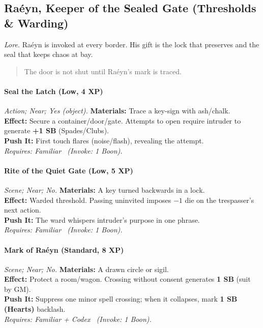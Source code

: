 \subsection{Raéyn, Keeper of the Sealed Gate (Thresholds \& Warding)}
\textit{Lore.} Raéyn is invoked at every border. His gift is the lock that preserves and the seal that keeps chaos at bay.

\begin{quote}
The door is not shut until Raéyn’s mark is traced.
\end{quote}

\paragraph{Seal the Latch (Low, 4 XP)} \emph{Action; Near; Yes (object).}
\textbf{Materials:} Trace a key-sign with ash/chalk.\\
\textbf{Effect:} Secure a container/door/gate. Attempts to open require intruder to generate \textbf{+1 SB} (Spades/Clubs).\\
\textbf{Push It:} First touch flares (noise/flash), revealing the attempt.\\
\emph{Requires: Familiar \ (\textit{Invoke:} 1 Boon).}

\paragraph{Rite of the Quiet Gate (Low, 5 XP)} \emph{Scene; Near; No.}
\textbf{Materials:} A key turned backwards in a lock.\\
\textbf{Effect:} Warded threshold. Passing uninvited imposes \(-1\) die on the trespasser’s next action.\\
\textbf{Push It:} The ward whispers intruder’s purpose in one phrase.\\
\emph{Requires: Familiar \ (\textit{Invoke:} 1 Boon).}

\paragraph{Mark of Raéyn (Standard, 8 XP)} \emph{Scene; Near; No.}
\textbf{Materials:} A drawn circle or sigil.\\
\textbf{Effect:} Protect a room/wagon. Crossing without consent generates \textbf{1 SB} (suit by GM).\\
\textbf{Push It:} Suppress one minor spell crossing; when it collapses, mark \textbf{1 SB (Hearts)} backlash.\\
\emph{Requires: Familiar + Codex \ (\textit{Invoke:} 1 Boon).}

